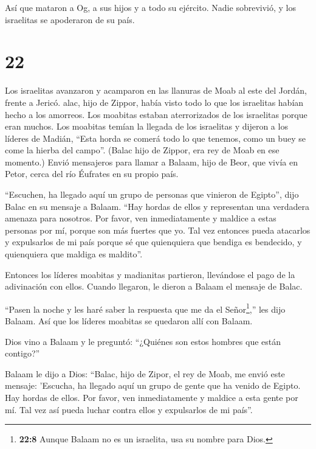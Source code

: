  Así que mataron a Og, a sus hijos y a todo su ejército.
Nadie sobrevivió, y los israelitas se apoderaron de su país.

\hypertarget{section-21}{%
\section{22}\label{section-21}}

 Los israelitas avanzaron y acamparon en las llanuras de
Moab al este del Jordán, frente a Jericó.  alac, hijo de
Zippor, había visto todo lo que los israelitas habían hecho a los
amorreos.  Los moabitas estaban aterrorizados de los
israelitas porque eran muchos. Los moabitas temían la llegada de los
israelitas  y dijeron a los líderes de Madián, ``Esta horda
se comerá todo lo que tenemos, como un buey se come la hierba del
campo''. (Balac hijo de Zippor, era rey de Moab en ese momento.)
 Envió mensajeros para llamar a Balaam, hijo de Beor, que
vivía en Petor, cerca del río Éufrates en su propio país.

``Escuchen, ha llegado aquí un grupo de personas que vinieron de
Egipto'', dijo Balac en su mensaje a Balaam. ``Hay hordas de ellos y
representan una verdadera amenaza para nosotros.  Por favor,
ven inmediatamente y maldice a estas personas por mí, porque son más
fuertes que yo. Tal vez entonces pueda atacarlos y expulsarlos de mi
país porque sé que quienquiera que bendiga es bendecido, y quienquiera
que maldiga es maldito''.

 Entonces los líderes moabitas y madianitas partieron,
llevándose el pago de la adivinación con ellos. Cuando llegaron, le
dieron a Balaam el mensaje de Balac.

 ``Pasen la noche y les haré saber la respuesta que me da el
Señor\footnote{\textbf{22:8} Aunque Balaam no es un israelita, usa su
  nombre para Dios.},'' les dijo Balaam. Así que los líderes moabitas se
quedaron allí con Balaam.

 Dios vino a Balaam y le preguntó: ``¿Quiénes son estos
hombres que están contigo?''

 Balaam le dijo a Dios: ``Balac, hijo de Zipor, el rey de
Moab, me envió este mensaje:  'Escucha, ha llegado aquí un
grupo de gente que ha venido de Egipto. Hay hordas de ellos. Por favor,
ven inmediatamente y maldice a esta gente por mí. Tal vez así pueda
luchar contra ellos y expulsarlos de mi país''.


